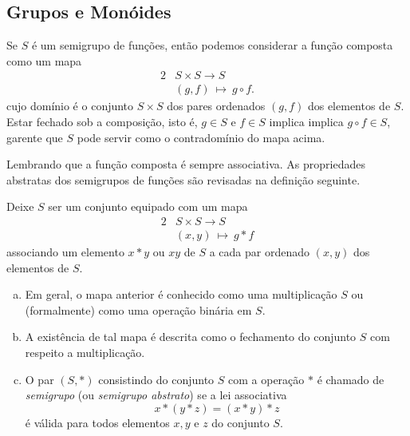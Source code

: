 \newpage

\subsection{Grupos e Monóides}
Se $S$ é um semigrupo de funções, então podemos considerar a função composta como um mapa
\begin{alignat}{2}
  &S \times S \to S \nonumber\\
  &\left(g,f\right)\ \mapsto\ g \circ f.
  \nonumber
\end{alignat}
cujo domínio é o conjunto $S \times S$ dos pares ordenados $(g,f)$ dos elementos de $S$. Estar fechado sob a composição, isto é, $g\in S$ e $f\in S$ implica implica $g\circ f \in S$, garente que $S$ pode servir como o contradomínio do mapa acima.

Lembrando que a função composta é sempre associativa. As propriedades abstratas dos semigrupos de funções são revisadas na definição seguinte.
\begin{definition}[Semigrupos]
  Deixe $S$ ser um conjunto equipado com um mapa
  \begin{alignat}{2}
    &S \times S \to S \nonumber\\
    &\left(x,y\right)\ \mapsto\ g * f
    \nonumber
  \end{alignat}
  associando um elemento $x* y$ ou $xy$ de $S$ a cada par ordenado $\left(x,y\right)$ dos elementos de $S$.
  \begin{enumerate}[(a)]
    \item Em geral, o mapa anterior é conhecido como uma multiplicação $S$ ou (formalmente) como uma operação binária em $S$.
    \item A existência de tal mapa é descrita como o fechamento do conjunto $S$ com respeito a multiplicação.
    \item O par $\left(S,* \right)$ consistindo do conjunto $S$ com a operação $*$ é chamado de \emph{semigrupo} (ou \emph{semigrupo abstrato}) se a lei associativa $$x * (y * z) = (x * y) * z$$ é válida para todos elementos $x,y$ e $z$ do conjunto $S$.
  \end{enumerate}
\end{definition}


